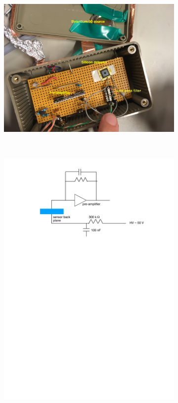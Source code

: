 \documentclass[12pt]{article}
\begin{document}
\begin{figure}[H]
  \centering
  \begin{subfigure}[b]{0.5\textwidth}
    \includegraphics[width=\textwidth]{./graphics/experimentalSetup}
    \caption{}
    \label{fig:ExperimentalSetup}
  \end{subfigure}
  ~
  \begin{subfigure}[b]{0.45\textwidth}
    \includegraphics[width=\textwidth]{./graphics/SiliconDiodeCircuit}

\end{subfigure}
\end{figure}
\end{document}
